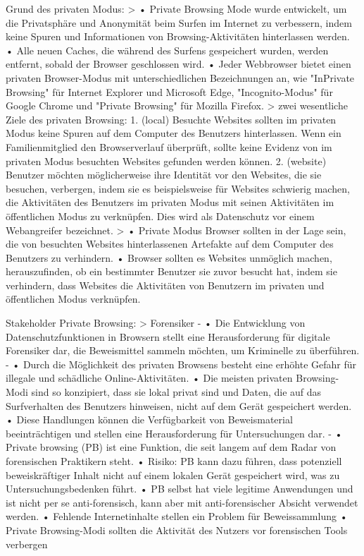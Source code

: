 Grund des privaten Modus:
	> \cite{Izzati.2022} 
		•	Private Browsing Mode wurde entwickelt, um die Privatsphäre und Anonymität beim Surfen im Internet zu verbessern, indem keine Spuren und Informationen von Browsing-Aktivitäten hinterlassen werden.
		•	Alle neuen Caches, die während des Surfens gespeichert wurden, werden entfernt, sobald der Browser geschlossen wird.
		•	Jeder Webbrowser bietet einen privaten Browser-Modus mit unterschiedlichen Bezeichnungen an, wie "InPrivate Browsing" für Internet Explorer und Microsoft Edge, "Incognito-Modus" für Google Chrome und "Private Browsing" für Mozilla Firefox.
	> \cite{Aggarwal.2010} zwei wesentliche Ziele des privaten Browsing: 
		1. (local) Besuchte Websites sollten im privaten Modus keine Spuren auf dem Computer des Benutzers hinterlassen. Wenn ein Familienmitglied den Browserverlauf überprüft, sollte keine Evidenz von im privaten Modus besuchten Websites gefunden werden können.
		2. (website) Benutzer möchten möglicherweise ihre Identität vor den Websites, die sie besuchen, verbergen, indem sie es beispielsweise für Websites schwierig machen, die Aktivitäten des Benutzers im privaten Modus mit seinen Aktivitäten im öffentlichen Modus zu verknüpfen. Dies wird als Datenschutz vor einem Webangreifer bezeichnet.
	> \cite{Montasari.2015} 
		•	Private Modus Browser sollten in der Lage sein, die von besuchten Websites hinterlassenen Artefakte auf dem Computer des Benutzers zu verhindern.
		•	Browser sollten es Websites unmöglich machen, herauszufinden, ob ein bestimmter Benutzer sie zuvor besucht hat, indem sie verhindern, dass Websites die Aktivitäten von Benutzern im privaten und öffentlichen Modus verknüpfen.
		


Stakeholder Private Browsing:
	> Forensiker 
		- \cite{Mahlous.2020}
			•	Die Entwicklung von Datenschutzfunktionen in Browsern stellt eine Herausforderung für digitale Forensiker dar, die Beweismittel sammeln möchten, um Kriminelle zu überführen.
		- \cite{Horsman.2019}
			•	Durch die Möglichkeit des privaten Browsens besteht eine erhöhte Gefahr für illegale und schädliche Online-Aktivitäten.
			•	Die meisten privaten Browsing-Modi sind so konzipiert, dass sie lokal privat sind und Daten, die auf das Surfverhalten des Benutzers hinweisen, nicht auf dem Gerät gespeichert werden.
			•	Diese Handlungen können die Verfügbarkeit von Beweismaterial beeinträchtigen und stellen eine Herausforderung für Untersuchungen dar.
		- \cite{Horsman.2019} 
			• Private browsing (PB) ist eine Funktion, die seit langem auf dem Radar von forensischen Praktikern steht.
			• Risiko: PB kann dazu führen, dass potenziell beweiskräftiger Inhalt nicht auf einem lokalen Gerät gespeichert wird, was zu Untersuchungsbedenken führt.
			•	  PB selbst hat viele legitime Anwendungen und ist nicht per se anti-forensisch, kann aber mit anti-forensischer Absicht verwendet werden.
			•	Fehlende Internetinhalte stellen ein Problem für Beweissammlung
			•	Private Browsing-Modi sollten die Aktivität des Nutzers vor forensischen Tools verbergen 
		

